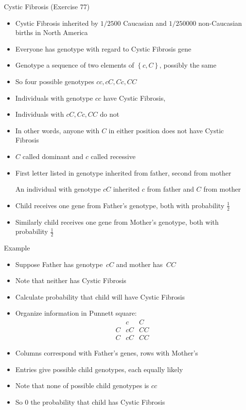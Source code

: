 \documentclass[handout]{beamer}
\theoremstyle{definition}
\begin{document}
\begin{frame}{Cystic Fibrosis (Exercise 77)}
\begin{itemize}
\item Cystic Fibrosis inherited by $1/2500$ Caucasian
and $1/250000$ non-Caucasian births in North America
\item Everyone has \alert{genotype}
with regard to Cystic Fibrosis gene
\item \alert{Genotype} a sequence of two elements of
$\left\{c,C\right\}$, possibly the same
\item So four possible genotypes $cc,cC,Cc,CC$
\item Individuals with genotype $cc$ \alert{have} Cystic Fibrosis,
\item Individuals with $cC,Cc,CC$ do \alert{not}
\item In other words, anyone with $C$ in either position
does \alert{not} have Cystic Fibrosis
\item $C$ called \alert{dominant} and $c$ called \alert{recessive}
\end{itemize}
\end{frame}

\begin{frame}
\begin{itemize}
\item First letter listed in genotype
inherited from father, second from mother
\begin{example}
An individual with genotype $cC$ inherited
$c$ from father and $C$ from mother
\end{example}
\item Child receives one gene from Father's genotype,
both with probability $\frac{1}{2}$
\item Similarly child receives one gene from Mother's genotype,
both with probability $\frac{1}{2}$
\end{itemize}
\end{frame}

\begin{frame}{Example}
\begin{itemize}
\item Suppose Father has genotype~$cC$ and mother has~$CC$
\item Note that neither has Cystic Fibrosis
\item Calculate probability that child will have Cystic Fibrosis
\item Organize information in \alert{Punnett square}:
\[\begin{array}{c|cc}
&c&C\\\hline
C&cC&CC\\
C&cC&CC
\end{array}\]
\item Columns correspond with Father's genes, rows with Mother's
\item Entries give possible child genotypes, each equally likely
\item Note that \alert{none} of possible child genotypes is $cc$
\item So $0$ the probability that child has Cystic Fibrosis
\end{itemize}
\end{frame}
\end{document}
